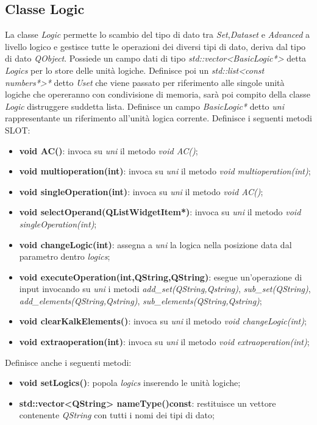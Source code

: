 \documentclass[a4paper,10pt]{article}
\begin{document}
        \subsection{Classe Logic}
        La classe \textit{Logic} permette lo scambio del tipo di dato tra \textit{Set},\textit{Dataset} e \textit{Advanced} a livello logico e gestisce tutte le operazioni dei diversi tipi di dato, deriva dal tipo di dato \textit{QObject}.
        Possiede un campo dati di tipo \textit{std::vector<BasicLogic*>} detta \textit{Logics} per lo store delle unità logiche.
        Definisce poi un \textit{std::list<const numbers*>*} detto \textit{Uset} che viene passato per riferimento alle singole unità logiche che opereranno con condivisione di memoria, sarà poi compito della classe \textit{Logic} distruggere suddetta lista.
        Definisce un campo \textit{BasicLogic*} detto \textit{uni} rappresentante un riferimento all'unità logica corrente.
        Definisce i seguenti metodi SLOT:
        \begin{itemize}
            \item \textbf{void AC()}: invoca su \textit{uni} il metodo \textit{void AC()};
            \item \textbf{void multioperation(int)}: invoca su \textit{uni} il metodo \textit{void multioperation(int)};
            \item \textbf{void singleOperation(int)}: invoca su \textit{uni} il metodo \textit{void AC()};
            \item \textbf{void selectOperand(QListWidgetItem*)}: invoca su \textit{uni} il metodo \textit{void singleOperation(int)};
            \item \textbf{void changeLogic(int)}: assegna a \textit{uni} la logica nella posizione data dal parametro dentro \textit{logics};
            \item \textbf{void executeOperation(int,QString,QString)}: esegue un'operazione di input invocando su \textit{uni} i metodi \textit{add\_set(QString,Qstring)}, \textit{sub\_set(QString)}, \textit{add\_elements(QString,Qstring)}, \textit{sub\_elements(QString,Qstring)};
            \item \textbf{void clearKalkElements()}: invoca su \textit{uni} il metodo \textit{void changeLogic(int)};
            \item \textbf{void extraoperation(int)}: invoca su \textit{uni} il metodo \textit{void extraoperation(int)};
        \end{itemize}
        Definisce anche i seguenti metodi:
        \begin{itemize}
            \item \textbf{void setLogics()}: popola \textit{logics} inserendo le unità logiche;
            \item \textbf{std::vector<QString> nameType()const}: restituisce un vettore contenente \textit{QString} con tutti i nomi dei tipi di dato;
        \end{itemize}
\end{document}
